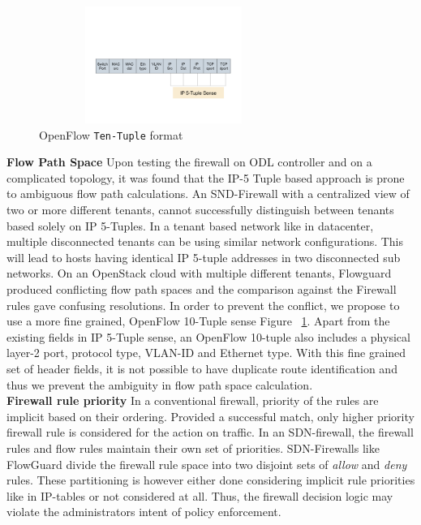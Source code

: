 \begin{figure}
	\includegraphics[height=1.5in, width=3.2in]{Pictures/10TUPLE.pdf}
	\caption{ OpenFlow \texttt{Ten-Tuple} format}
	\label{fig:tenTuple}
\end{figure}
\textbf{Flow Path Space} Upon testing the firewall on ODL controller and on a complicated topology, it was found that the IP-5 Tuple based approach is prone to ambiguous flow path calculations. An SND-Firewall with a centralized view of two or more different tenants, cannot successfully distinguish between tenants based solely on IP 5-Tuples. In a tenant based network like in datacenter, multiple disconnected tenants can be using similar network configurations. This will lead to hosts having identical IP 5-tuple addresses in two disconnected sub networks. On an OpenStack cloud with multiple different tenants, Flowguard produced conflicting flow path spaces and the comparison against the Firewall rules gave confusing resolutions. 
In order to prevent the conflict, we propose to use a more fine grained, OpenFlow 10-Tuple sense Figure ~\ref{fig:tenTuple}. Apart from the existing fields in IP 5-Tuple sense, an OpenFlow 10-tuple also includes a physical layer-2  port, protocol type, VLAN-ID and Ethernet type. With this fine grained set of header fields, it is not possible to have duplicate route identification and thus we prevent the ambiguity in flow path space calculation. \\
\textbf{Firewall rule priority}
In a conventional firewall, priority of the rules are implicit based on their ordering. Provided a successful match, only higher priority firewall rule is considered for the action on traffic. In an SDN-firewall, the firewall rules and flow rules maintain their own set of priorities. SDN-Firewalls like FlowGuard divide the firewall rule space into two disjoint sets of \textit{allow} and \textit{deny} rules. These partitioning is however either done considering implicit rule priorities like in IP-tables or not considered at all. Thus, the firewall decision logic may violate the administrators intent of policy enforcement.
